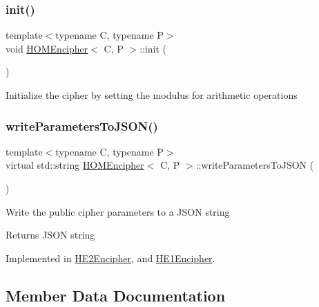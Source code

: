 \subsubsection{\texorpdfstring{init()}{init()}}
{\footnotesize\ttfamily template$<$typename C, typename P$>$ \\
void \hyperlink{classHOMEncipher}{H\+O\+M\+Encipher}$<$ C, P $>$\+::init (\begin{DoxyParamCaption}{ }\end{DoxyParamCaption})\hspace{0.3cm}{\ttfamily [inline]}}

Initialize the cipher by setting the modulus for arithmetic operations \mbox{\label{classHOMEncipher_abf176e3fb85de6f0f6a2c96563397d39}} 
\subsubsection{\texorpdfstring{write\+Parameters\+To\+J\+S\+O\+N()}{writeParametersToJSON()}}
{\footnotesize\ttfamily template$<$typename C, typename P$>$ \\
virtual std\+::string \hyperlink{classHOMEncipher}{H\+O\+M\+Encipher}$<$ C, P $>$\+::write\+Parameters\+To\+J\+S\+ON (\begin{DoxyParamCaption}{ }\end{DoxyParamCaption})\hspace{0.3cm}{\ttfamily [pure virtual]}}

Write the public cipher parameters to a J\+S\+ON string \begin{DoxyReturn}{Returns}
J\+S\+ON string 
\end{DoxyReturn}


Implemented in \hyperlink{classHE2Encipher_a802a75d83bb833bf458a1e89792026bc}{H\+E2\+Encipher}, and \hyperlink{classHE1Encipher_a0aa1ef94d9147591367dbbc6ce03e5e1}{H\+E1\+Encipher}.



\subsection{Member Data Documentation}
\mbox{\label{classHOMEncipher_aa645061096356f6e2fd5ad3f0dfc1fc1}} 
